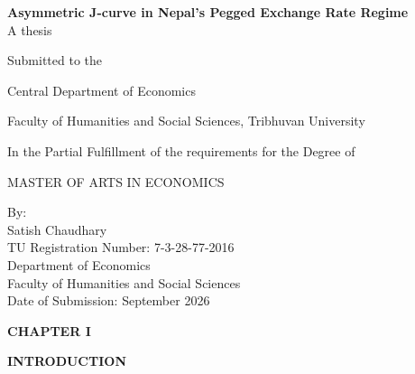 \documentclass[12pt]{article}
\begin{document}
\begin{center}

\vspace*{1cm}

{\LARGE \textbf{Asymmetric J-curve in Nepal's Pegged Exchange Rate Regime}} \\[4cm]

\vspace{0.5cm}
A thesis

\vspace{0.5cm}

Submitted to the 

\vspace{0.5cm}

Central Department of Economics

\vspace{0.5cm}

Faculty of Humanities and Social Sciences, Tribhuvan University 

\vspace{0.5cm}

In the Partial Fulfillment of the requirements for the Degree of

\vspace{0.5cm}

MASTER OF ARTS IN ECONOMICS

\vspace{1.5cm}

By:\\[0.5cm]
{\large Satish Chaudhary} \\[0.2cm]
TU Registration Number: 7-3-28-77-2016 \\[1.5cm]
Department of Economics \\[0.2cm]
Faculty of Humanities and Social Sciences \\[1.5cm]

Date of Submission: September 2026

\vspace*{1cm}

\end{center}

\newpage

\begin{center}
\textbf{CHAPTER I}
\end{center}
\begin{center}
\textbf{INTRODUCTION}
\end{center}


\vspace{0.5cm}
\end{document}
